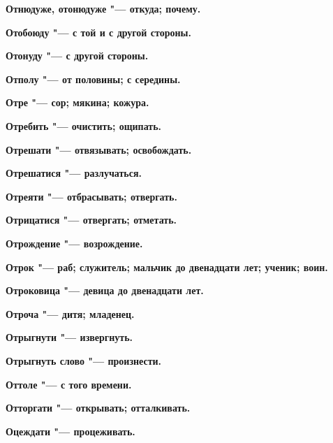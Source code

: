 \begin{multicols}{2}
\bfseries Отнюдуже, отонюдуже\normalfont{} "--- откуда; почему. 




\bfseries Отобоюду\normalfont{} "--- с той и с другой стороны. 




\bfseries Отонуду\normalfont{} "--- с другой стороны. 




\bfseries Отполу\normalfont{} "--- от половины; с середины. 




\bfseries Отре\normalfont{} "--- сор; мякина; кожура. 




\bfseries Отребить\normalfont{} "--- очистить; ощипать. 




\bfseries Отрешати\normalfont{} "--- отвязывать; освобождать. 




\bfseries Отрешатися\normalfont{} "--- разлучаться. 




\bfseries Отреяти\normalfont{} "--- отбрасывать; отвергать. 




\bfseries Отрицатися\normalfont{} "--- отвергать; отметать. 




\bfseries Отрождение\normalfont{} "--- возрождение. 




\bfseries Отрок\normalfont{} "--- раб; служитель; мальчик до двенадцати лет; ученик; воин. 




\bfseries Отроковица\normalfont{} "--- девица до двенадцати лет. 




\bfseries Отроча\normalfont{} "--- дитя; младенец. 




\bfseries Отрыгнути\normalfont{} "--- извергнуть. 




\bfseries Отрыгнуть слово\normalfont{} "--- произнести. 




\bfseries Оттоле\normalfont{} "--- с того времени. 




\bfseries Отторгати\normalfont{} "--- открывать; отталкивать. 




\bfseries Оцеждати\normalfont{} "--- процеживать. 





\end{multicols}
